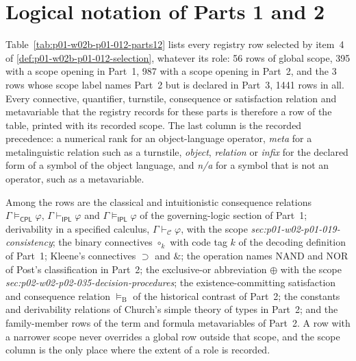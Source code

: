 \section{Logical notation of Parts 1 and 2}
\label{sec:p01-w02b-p01-012-parts12}

Table~\ref{tab:p01-w02b-p01-012-parts12} lists every registry row selected
by item~4 of \cref{def:p01-w02b-p01-012-selection}, whatever its role:
56 rows of global scope, 395 with a
scope opening in Part~1, 987 with a scope opening in
Part~2, and the 3 rows whose scope label names Part~2 but is declared in
Part~3, 1441 rows in all.  Every connective, quantifier, turnstile, consequence or
satisfaction relation and metavariable that the registry records for these
parts is therefore a row of the table, printed with its recorded scope.
The last column is the recorded precedence: a numerical rank for an
object-language operator, \emph{meta} for a metalinguistic relation such as
a turnstile, \emph{object}, \emph{relation} or \emph{infix} for the
declared form of a symbol of the object language, and \emph{n/a} for a
symbol that is not an operator, such as a metavariable.

Among the rows are the classical and intuitionistic consequence relations
\(\Gamma\models_{\mathsf{CPL}}\varphi\), \(\Gamma\vdash_{\mathsf{IPL}}\varphi\)
and \(\Gamma\models_{\mathsf{IPL}}\varphi\) of the governing-logic section of
Part~1; derivability in a specified calculus, \(\Gamma\vdash_{\mathcal C}\varphi\),
with the scope \emph{sec:p01-w02-p01-019-consistency}; the binary
connectives \(\circ_k\) with code tag \(k\) of the decoding definition of
Part~1; Kleene's connectives \(\supset\) and \(\&\); the operation names
\(\mathrm{NAND}\) and \(\mathrm{NOR}\) of Post's classification in
Part~2; the exclusive-or abbreviation \(\oplus\) with the scope
\emph{sec:p02-w02-p02-035-decision-procedures}; the existence-committing
satisfaction and consequence relation \(\models_{\mathrm B}\) of the
historical contrast of Part~2; the constants and
derivability relations of Church's simple theory of types in Part~2; and
the family-member rows of the term and formula metavariables of Part~2.
A row with a narrower scope never overrides a global row outside that
scope, and the scope column is the only place where the extent of a role is
recorded.

